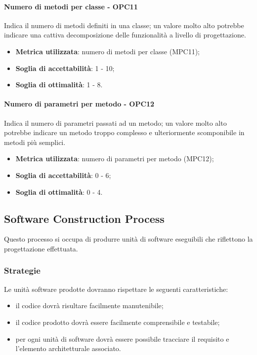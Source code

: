 \documentclass[PdQ.tex]{subfiles}
\begin{document}
			\paragraph{Numero di metodi per classe - OPC11}
			Indica il numero di metodi definiti in una classe; un valore molto alto potrebbe indicare una cattiva decomposizione delle funzionalità a livello di progettazione.
			\begin{itemize}
				\item \textbf{Metrica utilizzata}: numero di metodi per classe (MPC11);
				\item \textbf{Soglia di accettabilità}: 1 - 10;
				\item \textbf{Soglia di ottimalità}: 1 - 8.
			\end{itemize}
			
			\paragraph{Numero di parametri per metodo - OPC12}
			Indica il numero di parametri passati ad un metodo; un valore molto alto potrebbe indicare un
			metodo troppo complesso e ulteriormente scomponibile in metodi più semplici.
			\begin{itemize}
				\item \textbf{Metrica utilizzata}: numero di parametri per metodo (MPC12);
				\item \textbf{Soglia di accettabilità}: 0 - 6;
				\item \textbf{Soglia di ottimalità}: 0 - 4.
			\end{itemize}
		
	\subsection{Software Construction Process}
		Questo processo si occupa di produrre unità di software eseguibili che riflettono la progettazione effettuata.
		
		\subsubsection{Strategie}
			Le unità software prodotte dovranno rispettare le seguenti caratteristiche:
			\begin{itemize}
				\item il codice dovrà risultare facilmente manutenibile;
				\item il codice prodotto dovrà essere facilmente comprensibile e testabile;
				\item per ogni unità di software dovrà essere possibile tracciare il requisito e l'elemento architetturale associato.
			\end{itemize}
			
\end{document}
